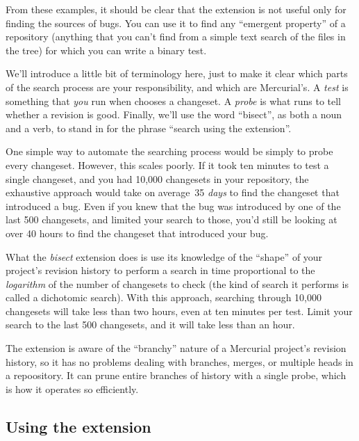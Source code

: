 From these examples, it should be clear that the 
extension is not useful only for finding the sources of bugs.  You can
use it to find any ``emergent property'' of a repository (anything
that you can't find from a simple text search of the files in the
tree) for which you can write a binary test.

We'll introduce a little bit of terminology here, just to make it
clear which parts of the search process are your responsibility, and
which are Mercurial's.  A \emph{test} is something that \emph{you} run
when  chooses a changeset.  A \emph{probe} is what
 runs to tell whether a revision is good.  Finally,
we'll use the word ``bisect'', as both a noun and a verb, to stand in
for the phrase ``search using the  extension''.

One simple way to automate the searching process would be simply to
probe every changeset.  However, this scales poorly.  If it took ten
minutes to test a single changeset, and you had 10,000 changesets in
your repository, the exhaustive approach would take on average~35
\emph{days} to find the changeset that introduced a bug.  Even if you
knew that the bug was introduced by one of the last 500 changesets,
and limited your search to those, you'd still be looking at over 40
hours to find the changeset that introduced your bug.

What the \emph{bisect} extension does is use its knowledge of the
``shape'' of your project's revision history to perform a search in
time proportional to the \emph{logarithm} of the number of changesets
to check (the kind of search it performs is called a dichotomic
search).  With this approach, searching through 10,000 changesets will
take less than two hours, even at ten minutes per test.  Limit your
search to the last 500 changesets, and it will take less than an hour.

The  extension is aware of the ``branchy'' nature of a
Mercurial project's revision history, so it has no problems dealing
with branches, merges, or multiple heads in a repoository.  It can
prune entire branches of history with a single probe, which is how it
operates so efficiently.

\subsection{Using the  extension}

